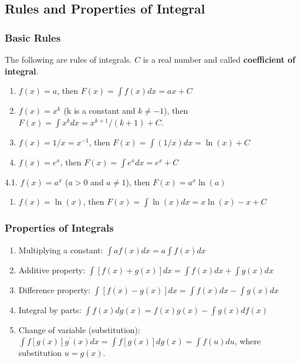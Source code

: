 \documentclass[
]{book}
\providecommand{\tightlist}{%
  \setlength{\itemsep}{0pt}\setlength{\parskip}{0pt}}
\begin{document}
\hypertarget{rules-and-properties-of-integral}{%
\subsection{Rules and Properties of Integral}\label{rules-and-properties-of-integral}}

\hypertarget{basic-rules}{%
\subsubsection{Basic Rules}\label{basic-rules}}

The following are rules of integrals. \(C\) is a real number and called \textbf{coefficient of integral}.

\begin{enumerate}
\def\labelenumi{\arabic{enumi}.}
\item
  \(f(x) = a\), then \(F(x) = \int f(x)dx = ax + C\)
\item
  \(f(x) = x^k\) (k is a constant and \(k \ne -1\)), then \(F(x) = \int x^k dx = x^{k+1}/(k+1) + C.\)
\item
  \(f(x) = 1/x = x^{-1}\), then \(F(x) = \int (1/x) dx = \ln(x) + C\)
\item
  \(f(x) = e^x\), then \(F(x) = \int e^x dx = e^x +C\)
\end{enumerate}

4.1. \(f(x) = a^x\) (\(a > 0\) and \(a \ne 1\)), then \(F(x) = a^x \ln(a)\)

\begin{enumerate}
\def\labelenumi{\arabic{enumi}.}
\setcounter{enumi}{4}
\tightlist
\item
  \(f(x) = \ln(x)\), then \(F(x) = \int \ln(x) dx = x\ln(x) - x + C\)
\end{enumerate}

\hfill\break

\hypertarget{properties-of-integrals}{%
\subsubsection{Properties of Integrals}\label{properties-of-integrals}}

\begin{enumerate}
\def\labelenumi{\arabic{enumi}.}
\item
  Multiplying a constant: \(\int af(x)dx = a\int f(x)dx\)
\item
  Additive property: \(\int [f(x) + g(x)]dx = \int f(x)dx + \int g(x)dx\)
\item
  Difference property: \(\int [f(x) - g(x)]dx = \int f(x)dx - \int g(x)dx\)
\item
  Integral by parts: \(\int f(x)dg(x) = f(x)g(x) - \int g(x)df(x)\)
\item
  Change of variable (substitution): \(\int f[g(x)] g^\prime(x)dx = \int f[g(x)] dg(x) = \int f(u)du\), where substitution \(u = g(x)\).
\end{enumerate}
\end{document}
